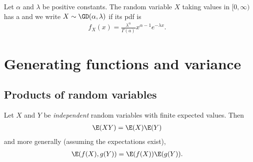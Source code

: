 \documentclass{article}
\begin{document}
\begin{definition}
    Let $\alpha$ and $\lambda$ be positive constants. The random variable
    $X$ taking values in $[0,\infty)$ has a  and we 
    write $X\sim\GD(\alpha, \lambda)$ if its pdf is
    \begin{align*}
        f_X(x) = \frac{\lambda^\alpha}{\Gamma(a)}x^{\alpha-1}e^{-\lambda x}.
    \end{align*}
\end{definition}
\section{Generating functions and variance}
\subsection{Products of random variables}
\begin{theorem}
    Let $X$ and $Y$ be \emph{independent} random variables with finite expected values.
    Then
    \begin{align*}
        \E(XY) = \E(X)\E(Y)
    \end{align*}
    and more generally (assuming the expectations exist),
    \begin{align*}
        \E(f(X), g(Y)) = \E(f(X))\E(g(Y)).
    \end{align*}
\end{theorem}
\end{document}
